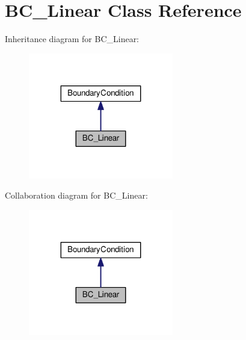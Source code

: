 \hypertarget{classBC__Linear}{}\section{B\+C\+\_\+\+Linear Class Reference}
\label{classBC__Linear}


Inheritance diagram for B\+C\+\_\+\+Linear\+:\nopagebreak
\begin{figure}[H]
\begin{center}
\leavevmode
\includegraphics[width=179pt]{classBC__Linear__inherit__graph}
\end{center}
\end{figure}


Collaboration diagram for B\+C\+\_\+\+Linear\+:\nopagebreak
\begin{figure}[H]
\begin{center}
\leavevmode
\includegraphics[width=179pt]{classBC__Linear__coll__graph}
\end{center}
\end{figure}

